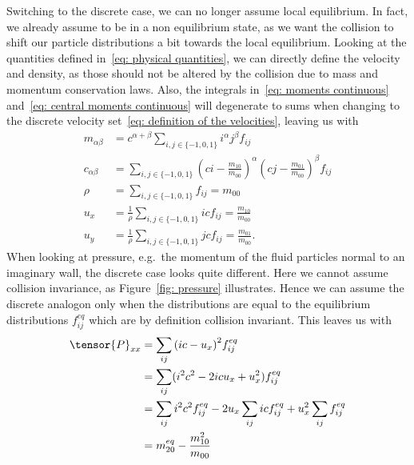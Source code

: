 Switching to the discrete case, we can no longer assume local equilibrium.
In fact, we already assume to be in a non equilibrium state, as we want the collision to shift our particle distributions a bit towards the local equilibrium.
Looking at the quantities defined in~\eqref{eq: physical quantities}, we can directly define the velocity and density, as those should not be altered by the collision due to mass and momentum conservation laws.
Also, the integrals in~\eqref{eq: moments continuous} and~\eqref{eq: central moments continuous} will degenerate to sums when changing to the discrete velocity set~\eqref{eq: definition of the velocities}, leaving us with
\begin{align}
  m_{\alpha\beta} &= c^{\alpha + \beta}\sum_{i,j \in \{-1,0,1\}} i^\alpha j^\beta f_{ij}
  \label{eq: moment definition}\\
  c_{\alpha\beta} &= \sum_{i,j \in \{-1,0,1\}}
  {\left(ci - \frac{m_{10}}{m_{00}}\right)}^\alpha
  {\left(cj - \frac{m_{01}}{m_{00}}\right)}^\beta f_{ij}
  \label{eq: central moment definition}\\
  \rho & = \sum_{i,j \in \{-1,0,1\}} f_{ij} = m_{00}
  \label{eq: density definition}\\
  u_x  & = \frac{1}{\rho} \sum_{i,j \in \{-1,0,1\}} ic f_{ij} = \frac{m_{10}}{m_{00}}
  \label{eq: x velocity definition}\\
  u_y  & = \frac{1}{\rho} \sum_{i,j \in \{-1,0,1\}} jc f_{ij} = \frac{m_{01}}{m_{00}}.
  \label{eq: y velocity definition}
\end{align}
When looking at pressure, e.g.\ the momentum of the fluid particles normal to an imaginary wall, the discrete case looks quite different.
Here we cannot assume collision invariance, as Figure~\ref{fig: pressure} illustrates.
Hence we can assume the discrete analogon only when the distributions are equal to the equilibrium distributions $f_{ij}^{eq}$ which are by definition collision invariant.
This leaves us with
\begin{equation}
  \begin{aligned}
    \tensor{P}_{xx}
    & = \sum_{ij} {(ic - u_x)}^2 f_{ij}^{eq}
    \\ & =
    \sum_{ij} (i^2c^2 - 2 ic u_x + u_x^2) f_{ij}^{eq}
    \\ & =
    \sum_{ij} i^2 c^2 f_{ij}^{eq} - 2 u_x \sum_{ij} ic f_{ij}^{eq} + u_x^2 \sum_{ij}f_{ij}^{eq}
    \\ & = m_{20}^{eq} - \frac{m_{10}^2}{m_{00}}
  \end{aligned}
\end{equation}
